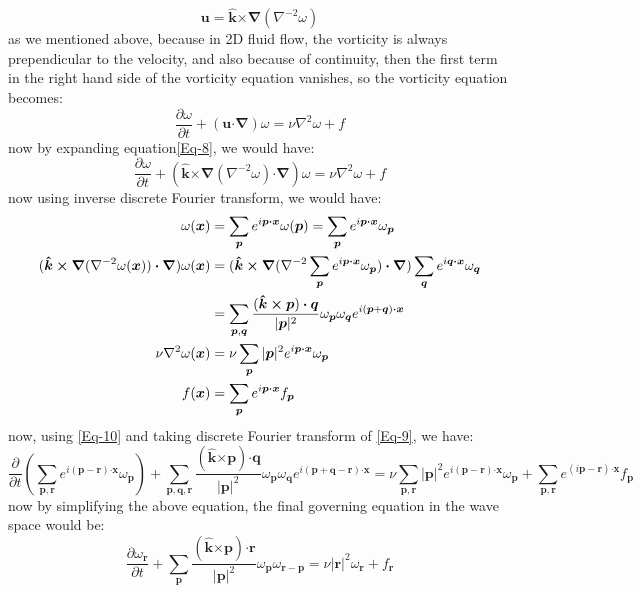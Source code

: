 \documentclass[10pt]{article}
\def\dotp{\bm{\cdot}}
\def\crossp{\bm{\times}}
\def\grad{\bm{\nabla}}
\def\lap{{\nabla}^2}
\def\lapinv{{\nabla}^{-2}}
\def\p{\bm{p}}
\def\q{\bm{q}}
\def\r{\bm{r}}
\def\u{\bm{u}}
\def\x{\bm{x}}
\def\eK{\bm{\hat{k}}}
\begin{document}
%
\begin{equation}\label{Eq-7}
\u=\eK\crossp\grad(\lapinv\omega)
\end{equation}
%
as we mentioned above, because in 2D fluid flow, the vorticity is always prependicular to the velocity, and also because of continuity, then the first term in the right hand side of the vorticity equation vanishes, so the vorticity equation becomes:
%
\begin{equation}\label{Eq-8}
\frac{\partial{\omega}}{\partial t} + (\u\dotp\grad)\omega= \nu\lap\omega + f
\end{equation}
%
now by expanding equation\eqref{Eq-8}, we would have:
%
\begin{equation}\label{Eq-9}
\frac{\partial{\omega}}{\partial t} + (\eK\crossp\grad(\lapinv\omega)\dotp\grad)\omega= \nu\lap\omega + f
\end{equation}
now using inverse discrete Fourier transform, we would have:
%
\begin{align}
\omega(\x)&=\sum_{\p}{e^{i\p\dotp\x}\omega(\p)}=\sum_{\p}{e^{i\p\dotp\x}\omega_{\p}} 		     \notag 
\\
(\eK\crossp\grad(\lapinv\omega(\x))\dotp\grad)\omega(\x) &=(\eK\crossp\grad(\lapinv\sum_{\p}{e^{i\p\dotp\x}\omega_{\p}})\dotp\grad)\sum_{\q}{e^{i\q\dotp\x}\omega_{\q}} 									 \notag 
\\
&=\sum_{\p,\q}{\frac{(\eK\crossp\p)\dotp\q}{|\p|^2}\omega_{\p}\omega_{\q}e^{i(\p+\q)\dotp\x}} \notag 
\\
\nu\lap\omega(\x)&=\nu\sum_{\p}{|\p|^2e^{i\p\dotp\x}\omega_{\p}} 								 \notag 
\\
f(\x)&=\sum_{\p}{e^{i\p\dotp\x}f_{\p}} \label{Eq-10}
\end{align}
%
now, using \eqref{Eq-10} and taking discrete Fourier transform of \eqref{Eq-9}, we have:
%
\begin{equation}\label{Eq-11}
\frac{\partial}{\partial t}({\sum_{\p,\r}{e^{i(\p-\r)\dotp\x}\omega_{\p}}}) + \sum_{\p,\q,\r}{\frac{(\eK\crossp\p)\dotp\q}{|\p|^2}\omega_{\p}\omega_{\q}e^{i(\p+\q-\r)\dotp\x}}= \nu\sum_{\p,\r}{|\p|^2e^{i(\p-\r)\dotp\x}\omega_{\p}} + \sum_{\p,\r}{e^{(i\p-\r)\dotp\x}f_{\p}}
\end{equation}
%
now by simplifying the above equation, the final governing equation in the wave space would be:
%
\begin{equation}\label{Eq-12}
\frac{\partial\omega_{\r}}{\partial t} + \sum_{\p}{\frac{(\eK\crossp\p)\dotp\r}{|\p|^2}\omega_{\p}\omega_{\r-\p}}= \nu{|\r|}^2\omega_{\r} + f_{\r}
\end{equation}
\end{document}
